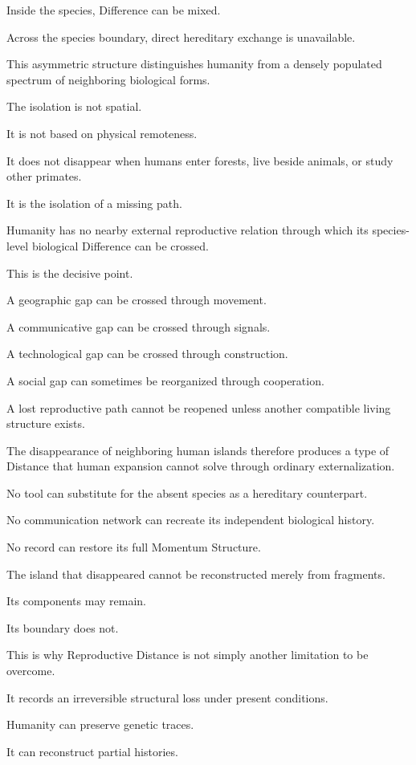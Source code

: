 Inside the species, Difference can be mixed.

Across the species boundary, direct hereditary exchange is unavailable.

This asymmetric structure distinguishes humanity from a densely populated spectrum of neighboring biological forms.

The isolation is not spatial.

It is not based on physical remoteness.

It does not disappear when humans enter forests, live beside animals, or study other primates.

It is the isolation of a missing path.

Humanity has no nearby external reproductive relation through which its species-level biological Difference can be crossed.

This is the decisive point.

A geographic gap can be crossed through movement.

A communicative gap can be crossed through signals.

A technological gap can be crossed through construction.

A social gap can sometimes be reorganized through cooperation.

A lost reproductive path cannot be reopened unless another compatible living structure exists.

The disappearance of neighboring human islands therefore produces a type of Distance that human expansion cannot solve through ordinary externalization.

No tool can substitute for the absent species as a hereditary counterpart.

No communication network can recreate its independent biological history.

No record can restore its full Momentum Structure.

The island that disappeared cannot be reconstructed merely from fragments.

Its components may remain.

Its boundary does not.

This is why Reproductive Distance is not simply another limitation to be overcome.

It records an irreversible structural loss under present conditions.

Humanity can preserve genetic traces.

It can reconstruct partial histories.

